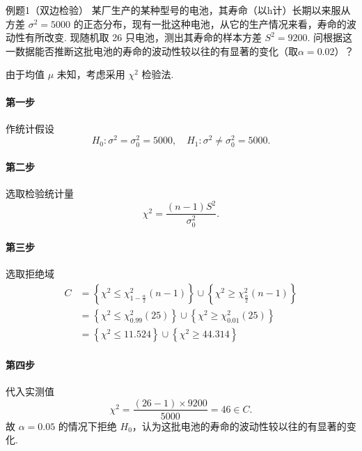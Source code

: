 \begin{question}{例题1（双边检验）}
    某厂生产的某种型号的电池，其寿命（以h计）长期以来服从方差 $\sigma^2=5000$ 的正态分布，现有一批这种电池，从它的生产情况来看，寿命的波动性有所改变. 现随机取 26 只电池，测出其寿命的样本方差 $S^2=9200$. 问根据这一数据能否推断这批电池的寿命的波动性较以往的有显著的变化（取$\alpha=0.02$）？
\end{question}
\begin{solution}
    由于均值 $\mu$ 未知，考虑采用 $\chi^2$ 检验法.
    \paragraph{第一步} 作统计假设
    $$
        H_0:\sigma^2 = \sigma_0^2 = 5000, \quad H_1:\sigma^2\neq\sigma_0^2 = 5000.
    $$
    \paragraph{第二步} 选取检验统计量
    $$
        \chi^2 = \frac{(n-1)S^2}{\sigma_0^2}.
    $$
    \paragraph{第三步} 选取拒绝域
    $$
        \begin{aligned}
            C
             & = \left\{\chi^2 \leqslant \chi_{1-\frac{\alpha}{2}}^2(n-1)\right\} \cup \left\{\chi^2 \geqslant \chi_{\frac{\alpha}{2}}^2(n-1)\right\} \\
             & = \left\{\chi^2 \leqslant \chi_{0.99}^2(25)\right\} \cup \left\{\chi^2 \geqslant \chi_{0.01}^2(25)\right\}                             \\
             & = \left\{\chi^2 \leqslant 11.524\right\} \cup \left\{\chi^2 \geqslant 44.314\right\}
        \end{aligned}
    $$
    \paragraph{第四步} 代入实测值
    $$
        \chi^2 = \frac{(26-1) \times 9200}{5000} = 46 \in C.
    $$
    故 $\alpha = 0.05$ 的情况下拒绝 $H_0$，认为这批电池的寿命的波动性较以往的有显著的变化.
\end{solution}




